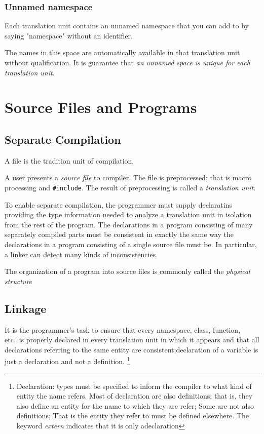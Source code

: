 \documentclass[11pt, a4paper]{book}
\begin{document}
\subsection{Unnamed namespace}
Each translation unit contains an unnamed namespace that you can add to by saying "namespace" without an identifier.

The names in this space are automatically available in that translation unit without qualification. It is guarantee that \emph{an unnamed space is unique for each translation unit}.

\chapter{Source Files and Programs}
\section{Separate Compilation}
A file is the tradition unit of compilation.

A user presents a \emph{source file} to compiler. The file is preprocessed; that is macro processing and \verb|#include|. The result of preprocessing is called a \emph{translation unit}.

To enable separate compilation, the programmer must supply declaratins providing the type information needed to analyze a translation unit in isolation from the rest of the program. The declarations in a program consisting of many separately compiled parts must be consistent in exactly the same way the declarations in a program consisting of a single source file must be. In particular, a linker can detect many kinds of inconsistencies.

The organization of a program into source files is commonly called the \emph{physical structure}

\section{Linkage}It is the programmer's task to ensure that every namespace, class, function, etc.\ is properly declared in every translation unit in which it appears and that all declarations referring to the same entity are consistent;declaration of a variable is just a declaration and not a definition. \footnote{Declaration: types must be specified to inform the compiler to what kind of entity the name refers. Most of declaration are also definitions; that is, they also define an entity for the name to which they are refer; Some are not also definitions; That is the entity they refer to must be defined elsewhere.  The keyword \emph{extern} indicates that it is only adeclaration}
\end{document}
